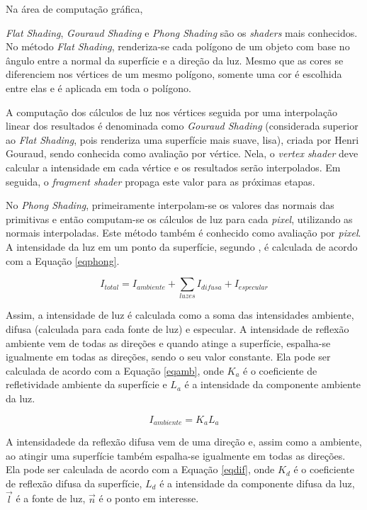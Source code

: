 	Na área de computação gráfica, {\textit{Flat Shading}, \textit{Gouraud Shading} e \textit{Phong Shading} são os \textit{shaders} mais conhecidos. No método \textit{Flat Shading}, renderiza-se cada polígono de um objeto com base no ângulo entre a normal da superfície e a direção da luz. Mesmo que as cores se diferenciem nos vértices de um mesmo polígono, somente uma cor é escolhida entre elas e é aplicada em toda o polígono.  

	A computação dos cálculos de luz nos  vértices seguida por uma interpolação linear dos resultados é denominada como \textit{Gouraud Shading} (considerada superior ao \textit{Flat Shading}, pois renderiza uma superfície mais suave, lisa), criada por Henri Gouraud, sendo conhecida como avaliação por vértice. Nela, o \textit{vertex shader} deve calcular a intensidade em cada vértice e os resultados serão interpolados. Em seguida, o \textit{fragment shader} propaga este valor para as próximas etapas. 

	No \textit{Phong Shading}, primeiramente interpolam-se os valores das normais das primitivas e então computam-se os cálculos de luz para cada \textit{pixel}, utilizando as normais interpoladas. Este método também é conhecido como avaliação por \textit{pixel}. A intensidade da luz em um ponto da superfície, segundo \cite{guha2011}, é calculada de acordo com a Equação \ref{eqphong}.  

	\begin{equation}
		I_ {total} = I_ {ambiente} +  \sum\limits_ {luzes} I_ {difusa} + I_ {especular}
	\label{eqphong}
	\end{equation}

	Assim, a intensidade de luz é calculada como a soma das intensidades ambiente, difusa (calculada para cada fonte de luz) e especular.  A intensidade de reflexão ambiente vem de todas as direções e quando atinge a superfície, espalha-se igualmente em todas as direções, sendo o seu valor constante. Ela pode ser calculada de acordo com a Equação \ref{eqamb}, onde $K_ {a}$ é o coeficiente de refletividade ambiente da superfície e $L_ {a}$ é a intensidade da componente ambiente da luz.

	\begin{equation}
		I_ {ambiente} = K_ {a}L_ {a} 
	\label{eqamb}
	\end{equation}

	A intensidadede da reflexão difusa vem de uma direção e, assim como a ambiente, ao atingir uma superfície também espalha-se igualmente em todas as direções. Ela pode ser calculada de acordo com a Equação \ref{eqdif}, onde $K_ {d}$ é o coeficiente de reflexão difusa da superfície, $L_ {d}$ é a intensidade da componente difusa da luz, $\overrightarrow{ l}$ é a fonte de luz, $\overrightarrow{ n}$ é o ponto em interesse.

}
